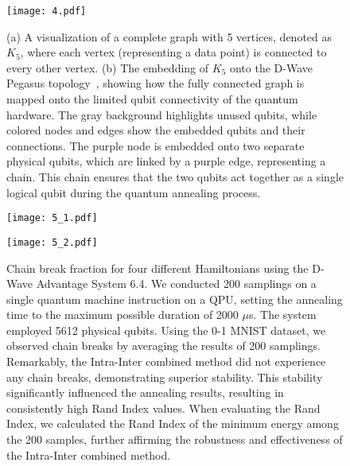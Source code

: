 \documentclass[showpacs,twocolumn,superscriptaddress]{revtex4-2}
\begin{document}
\begin{figure}[t]  
    \centering
    \texttt{[image: 4.pdf]}
    \caption{(a) A visualization of a complete graph with 5 vertices, denoted as $K_5$, where each vertex (representing a data point) is connected to every other vertex. (b) The embedding of $K_5$ onto the D-Wave Pegasus topology~\cite{boothby2020nextgenerationtopologydwavequantum}, showing how the fully connected graph is mapped onto the limited qubit connectivity of the quantum hardware. The gray background highlights unused qubits, while colored nodes and edges show the embedded qubits and their connections. The purple node is embedded onto two separate physical qubits, which are linked by a purple edge, representing a chain. This chain ensures that the two qubits act together as a single logical qubit during the quantum annealing process.}
    \label{fig:4}
\end{figure}

\begin{figure*}[!ht]
  \begin{minipage}[b]{0.5\textwidth}
    \centering
    \texttt{[image: 5\_1.pdf]}
  \end{minipage}%
  \begin{minipage}[b]{0.5\textwidth}
    \centering
    \texttt{[image: 5\_2.pdf]}
  \end{minipage}
    \caption{Chain break fraction for four different Hamiltonians using the D-Wave Advantage System 6.4. We conducted 200 samplings on a single quantum machine instruction on a QPU, setting the annealing time to the maximum possible duration of 2000 $\mu$s. The system employed 5612 physical qubits. Using the 0-1 MNIST dataset, we observed chain breaks by averaging the results of 200 samplings. Remarkably, the Intra-Inter combined method did not experience any chain breaks, demonstrating superior stability. This stability significantly influenced the annealing results, resulting in consistently high Rand Index values. When evaluating the Rand Index, we calculated the Rand Index of the minimum energy among the 200 samples, further affirming the robustness and effectiveness of the Intra-Inter combined method.}
    \label{fig:5}
\end{figure*}
\end{document}
